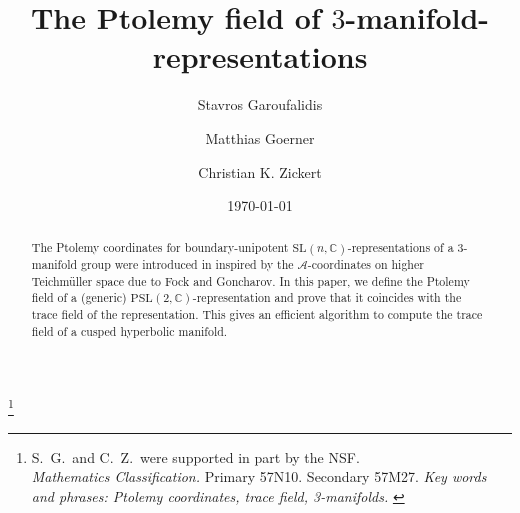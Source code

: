 \documentclass[12pt]{amsart}
\theoremstyle{definition}
\numberwithin{equation}{section}
\def\SL{\mathrm{SL}}
\def\PSL{\mathrm{PSL}}
\def\C{\mathbb{C}}
\begin{document}
\begin{abstract}
The Ptolemy coordinates for boundary-unipotent $\SL(n,\C)$-representations of a 
3-manifold group were introduced in 
\cite{GaroufalidisThurstonZickert} inspired by the $\mathcal A$-coordinates 
on higher Teichm\"{u}ller space due to Fock and Goncharov. In this paper, 
we define the Ptolemy field of a (generic) $\PSL(2,\C)$-representation and prove that it coincides with the trace field
of the representation. This gives an efficient algorithm to compute the
trace field of a cusped hyperbolic manifold.%
\end{abstract}



\title[The Ptolemy field of $3$-manifold-representations]{
The Ptolemy field of $3$-manifold-representations}
\author{Stavros Garoufalidis}
\address{School of Mathematics \\
         Georgia Institute of Technology \\
         Atlanta, GA 30332-0160, USA \newline
         {\tt \url{http://www.math.gatech.edu/~stavros }}}
\author{Matthias Goerner}
\address{University of Maryland \\
         Department of Mathematics \\
         College Park, MD 20742-4015, USA \newline
         {\tt \url{http://math.berkeley.edu/~matthias/}}}
\author{Christian K. Zickert}
\address{University of Maryland \\
         Department of Mathematics \\
         College Park, MD 20742-4015, USA \newline
         {\tt \url{http://www2.math.umd.edu/~zickert}}}
\thanks{S.~G.~and C.~Z.~were supported in part by the NSF. \\
 {\em Mathematics Classification.} Primary 57N10. Secondary 57M27.
\newline
{\em Key words and phrases: Ptolemy coordinates, trace field, 3-manifolds.
}
}

\date{\today }

\maketitle
\end{document}
